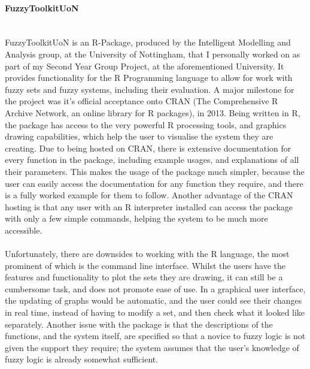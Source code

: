 \paragraph{FuzzyToolkitUoN}\ \\
FuzzyToolkitUoN is an R-Package, produced by the Intelligent Modelling and Analysis group, at the University of Nottingham, that I personally worked on as part of my Second Year Group Project, at the aforementioned University. It provides functionality for the R Programming language to allow for work with fuzzy sets and fuzzy systems, including their evaluation. A major milestone for the project was it's official acceptance onto CRAN (The Comprehensive R Archive Network, an online library for R packages), in 2013. Being written in R, the package has access to the very powerful R processing tools, and graphics drawing capabilities, which help the user to visualise the system they are creating. Due to being hosted on CRAN, there is extensive documentation for every function in the package, including example usages, and explanations of all their parameters. This makes the usage of the package much simpler, because the user can easily access the documentation for any function they require, and there is a fully worked example for them to follow. Another advantage of the CRAN hosting is that any user with an R interpreter installed can access the package with only a few simple commands, helping the system to be much more accessible.\ \\
\ \\
Unfortunately, there are downsides to working with the R language, the most prominent of which is the command line interface. Whilst the users have the features and functionality to plot the sets they are drawing, it can still be a cumbersome task, and does not promote ease of use. In a graphical user interface, the updating of graphs would be automatic, and the user could see their changes in real time, instead of having to modify a set, and then check what it looked like separately. Another issue with the package is that the descriptions of the functions, and the system itself, are specified so that a novice to fuzzy logic is not given the support they require; the system assumes that the user's knowledge of fuzzy logic is already somewhat sufficient.

